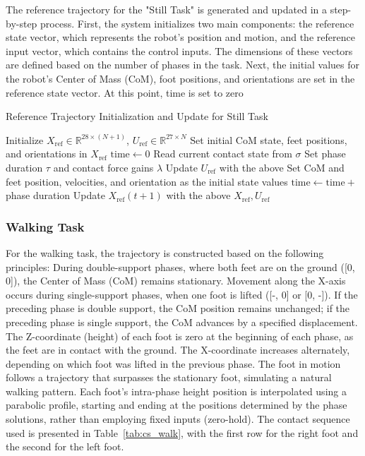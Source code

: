 \documentclass[main.tex]{subfiles}
\begin{document}
The reference trajectory for the "Still Task" is generated and updated in a step-by-step process. First, the system initializes two main components: the reference state vector, which represents the robot's position and motion, and the reference input vector, which contains the control inputs. The dimensions of these vectors are defined based on the number of phases in the task.
Next, the initial values for the robot's Center of Mass (CoM), foot positions, and orientations are set in the reference state vector. At this point, time is set to zero
\begin{algorithm}[H]
\caption{Reference Trajectory Initialization and Update for Still Task}
\begin{algorithmic}[1]
\State Initialize $X_{\text{ref}} \in \mathbb{R}^{28 \times (N+1)}$, $U_{\text{ref}} \in \mathbb{R}^{27 \times N}$
\State Set initial CoM state, feet positions, and orientations in $X_{\text{ref}}$
\State $\text{time} \gets 0$
    \State Read current contact state from $\sigma$
    \State Set phase duration $\tau$ and contact force gains $\lambda$
    \State Update $U_{\text{ref}}$ with the above
    \State Set CoM and feet position, velocities, and orientation as the initial state values
    \State $\text{time} \gets \text{time} +$ phase duration
    \State Update $X_{\text{ref}}(t+1)$ with the above
\EndFor
\State \Return $X_{\text{ref}}, U_{\text{ref}}$
\end{algorithmic}
\end{algorithm}

\subsubsection*{Walking Task}

For the walking task, the trajectory is constructed based on the following principles:
During double-support phases, where both feet are on the ground ([0, 0]), the Center of Mass (CoM) remains stationary. Movement along the X-axis occurs during single-support phases, when one foot is lifted ([-, 0] or [0, -]). If the preceding phase is double support, the CoM position remains unchanged; if the preceding phase is single support, the CoM advances by a specified displacement.
The Z-coordinate (height) of each foot is zero at the beginning of each phase, as the feet are in contact with the ground. The X-coordinate increases alternately, depending on which foot was lifted in the previous phase. The foot in motion follows a trajectory that surpasses the stationary foot, simulating a natural walking pattern.
Each foot's intra-phase height position is interpolated using a parabolic profile, starting and ending at the positions determined by the phase solutions, rather than employing fixed inputs (zero-hold).
The contact sequence used is presented in Table~\ref{tab:cs_walk}, with the first row for the right foot and the second for the left foot.
\end{document}
